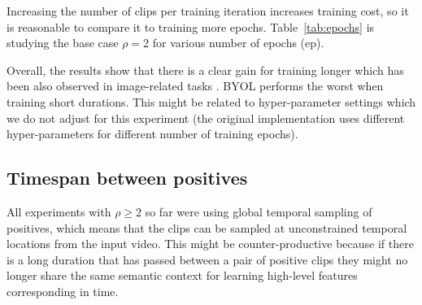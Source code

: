 \documentclass[final]{cvpr}
\newcommand{\tblref}[1]{Table~\ref{#1}}
\begin{document}
	
	Increasing the number of clips per training iteration increases training cost, so it is reasonable to compare it to training more epochs. \tblref{tab:epochs} is studying the base case  $\rho{=}$2 for various number of epochs (ep).
	
	Overall, the results show that there is a clear gain for training longer which has been also observed in image-related tasks \cite{Chen20,He20,Grill2020,Caron20}. 
	BYOL performs the worst when training short durations. This might be related to hyper-parameter settings which we do not adjust for this experiment (the original implementation \cite{Grill2020}  uses different hyper-parameters for different number of training epochs). 
	
	\subsection{Timespan between positives}
		All experiments with $\rho{\geq}$2 so far were using global temporal sampling of positives, which means that the clips can be sampled at unconstrained temporal locations from the input video. This might be counter-productive because if there is a long duration that has passed between a pair of positive clips they might no longer share the same semantic context for learning high-level features corresponding in time. 
		
\end{document}
